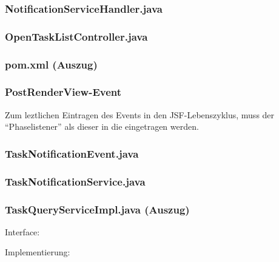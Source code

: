 \subsubsection{NotificationServiceHandler.java}
\label{app:NotificationServiceHandler}


\subsubsection{OpenTaskListController.java}
\label{app:OpenTaskListController}


\subsubsection{pom.xml (Auszug)}
\label{app:pom.xml}


\clearpage
\subsubsection{PostRenderView-Event}
\label{app:PostRenderView-Event}
Zum leztlichen Eintragen des Events in den JSF-Lebenszyklus, muss der \sog "`Phaselistener"' als dieser in die
 eingetragen werden.



\subsubsection{TaskNotificationEvent.java}
\label{app:TaskNotificationEvent}


\subsubsection{TaskNotificationService.java}
\label{app:TaskNotificationService}


\subsubsection{TaskQueryServiceImpl.java (Auszug)}
\label{app:TaskQueryServiceImpl}
Interface:

Implementierung:


